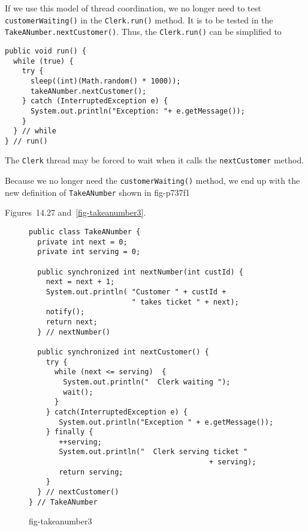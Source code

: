 If we use this model of thread coordination, we no longer need to test
{\tt customerWaiting()} in the {\tt Clerk.run()} method.  It is
to be tested in the {\tt TakeANumber.nextCustomer()}. Thus,
the {\tt Clerk.run()} can be simplified to

\begin{jjjlisting}
\begin{lstlisting}
public void run() {
  while (true) {
    try {
      sleep((int)(Math.random() * 1000));
      takeANumber.nextCustomer();
    } catch (InterruptedException e) {
      System.out.println("Exception: "+ e.getMessage());
    }
  } // while
} // run()
\end{lstlisting}
\end{jjjlisting}

\noindent The {\tt Clerk} thread may be forced to wait
when it calls the {\tt nextCustomer} method.


Because we no longer need the {\tt customerWaiting()} method, we end
up with the new definition of {\tt TakeANumber} shown in
{fig-p737f1}

Figures~14.27 and~\ref{fig-takeanumber3}.  

\begin{figure}[h]
\jjjprogstart
\begin{jjjlisting}
\begin{lstlisting}
public class TakeANumber {
  private int next = 0;
  private int serving = 0;

  public synchronized int nextNumber(int custId) {
    next = next + 1;
    System.out.println( "Customer " + custId + 
                        " takes ticket " + next);
    notify();
    return next;
  } // nextNumber()

  public synchronized int nextCustomer() {
    try {
      while (next <= serving)  {
        System.out.println("  Clerk waiting ");
        wait();
      }
    } catch(InterruptedException e) {
       System.out.println("Exception " + e.getMessage());
    } finally {
       ++serving;
       System.out.println("  Clerk serving ticket " 
                                          + serving);
       return serving;
    }
  } // nextCustomer()
} // TakeANumber
\end{lstlisting}
\end{jjjlisting}
{fig-takeanumber3}
\end{figure}


